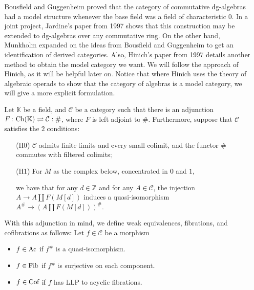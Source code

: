 \documentclass[../thesis.tex]{subfiles}
\begin{document}
            Bousfield and Guggenheim \cite{Bousfield76} proved that the category of commutative dg-algebras had a model structure whenever the base field was a field of characteristic $0$. In a joint project, Jardine's paper from 1997 \cite{Jardine97} shows that this construction may be extended to dg-algebras over any commutative ring. On the other hand, Munkholm expanded on the ideas from Bousfield and Guggenheim to get an identification of derived categories. Also, Hinich's paper from 1997 \cite{Hinich97} details another method to obtain the model category we want. We will follow the approach of Hinich, as it will be helpful later on. Notice that where Hinich uses the theory of algebraic operads to show that the category of algebras is a model category, we will give a more explicit formulation.

            Let $\mathbb{K}$ be a field, and $\mathcal{C}$ be a category such that there is an adjunction $F : \tt{Ch}(\mathbb{K}) \rightleftharpoons \mathcal{C} : \#$, where $F$ is left adjoint to $\#$. Furthermore, suppose that $\mathcal{C}$ satisfies the $2$ conditions:
            \begin{itemize}
                \item[(H0)] $\mathcal{C}$ admits finite limits and every small colimit, and the functor $\#$ commutes with filtered colimits;
                \item[(H1)] For $M$ as the complex below, concentrated in $0$ and $1$,
                \begin{center}
                \end{center}
                we have that for any $d\in \mathbb{Z}$ and for any $A\in\mathcal{C}$, the injection $A \rightarrow A \coprod F(M[d])$ induces a quasi-isomorphism $A^\# \rightarrow (A\coprod F(M[d]))^\#$.
            \end{itemize}
                
            With this adjunction in mind, we define weak equivalences, fibrations, and cofibrations as follows:
            Let $f\in \mathcal{C}$ be a morphism
            \begin{itemize}
                \item $f\in \tt{Ac}$ if $f^\#$ is a quasi-isomorphism.
                \item $f\in \tt{Fib}$ if $f^\#$ is surjective on each component.
                \item $f\in \tt{Cof}$ if $f$ has LLP to acyclic fibrations.
            \end{itemize}
\end{document}
